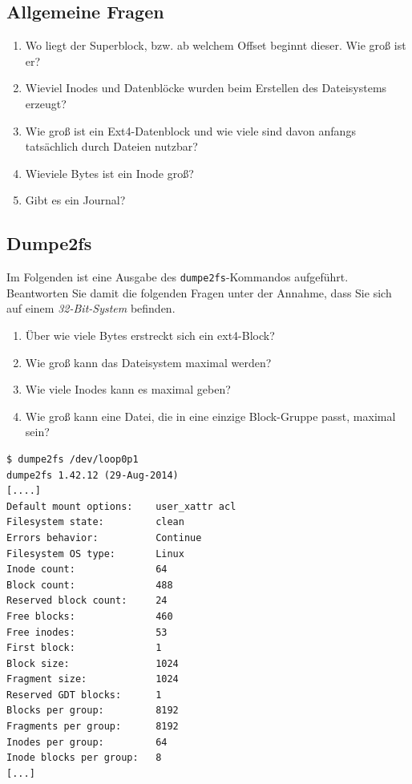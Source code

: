\documentclass[11pt,a4paper]{article}
\def\inlinebash{\lstinline[style=bash]}
\begin{document}
\subsection{Allgemeine Fragen}
\begin{enumerate}
\item Wo liegt der Superblock, bzw. ab welchem Offset beginnt dieser.
	Wie groß ist er?
\item Wieviel Inodes und Datenblöcke wurden beim Erstellen des Dateisystems erzeugt?
\item Wie groß ist ein Ext4-Datenblock und wie viele sind davon anfangs
	tatsächlich durch Dateien nutzbar?
\item Wieviele Bytes ist ein Inode groß?
\item Gibt es ein Journal?

\end{enumerate}

\subsection{Dumpe2fs}
Im Folgenden ist eine Ausgabe des \inlinebash$dumpe2fs$-Kommandos
	aufgeführt. Beantworten Sie damit die folgenden Fragen unter der Annahme,
	dass Sie sich auf einem \emph{32-Bit-System} befinden.
	\begin{enumerate}
		\item Über wie viele Bytes erstreckt sich ein ext4-Block?
		\item Wie groß kann das Dateisystem maximal werden?
		\item Wie viele Inodes kann es maximal geben?
		\item Wie groß kann eine Datei, die in eine einzige Block-Gruppe passt,
			maximal sein?
	\end{enumerate}

	\begin{lstlisting}[style=bash]
$ dumpe2fs /dev/loop0p1
dumpe2fs 1.42.12 (29-Aug-2014)
[....]
Default mount options:    user_xattr acl
Filesystem state:         clean
Errors behavior:          Continue
Filesystem OS type:       Linux
Inode count:              64
Block count:              488
Reserved block count:     24
Free blocks:              460
Free inodes:              53
First block:              1
Block size:               1024
Fragment size:            1024
Reserved GDT blocks:      1
Blocks per group:         8192
Fragments per group:      8192
Inodes per group:         64
Inode blocks per group:   8
[...]
	\end{lstlisting}
\end{document}
